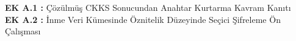 \singlespacing
\textbf{EK A.1 :} Çözülmüş CKKS Sonucundan Anahtar Kurtarma Kavram Kanıtı\\
\textbf{EK A.2 :} İnme Veri Kümesinde Öznitelik Düzeyinde Seçici Şifreleme Ön Çalışması\\
\newpage
